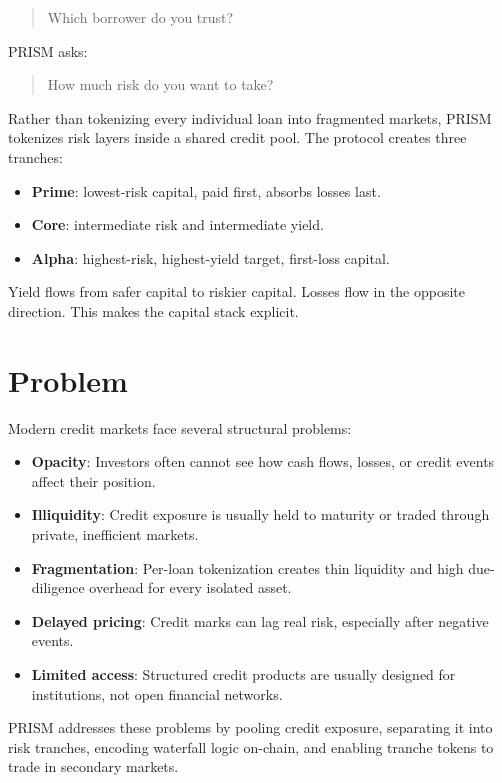 \documentclass[11pt]{article}
\begin{document}
\begin{quote}
Which borrower do you trust?
\end{quote}

PRISM asks:

\begin{quote}
How much risk do you want to take?
\end{quote}

Rather than tokenizing every individual loan into fragmented markets, PRISM
tokenizes risk layers inside a shared credit pool. The protocol creates three
tranches:

\begin{itemize}
  \item \textbf{Prime}: lowest-risk capital, paid first, absorbs losses last.
  \item \textbf{Core}: intermediate risk and intermediate yield.
  \item \textbf{Alpha}: highest-risk, highest-yield target, first-loss capital.
\end{itemize}

Yield flows from safer capital to riskier capital. Losses flow in the opposite
direction. This makes the capital stack explicit.

\section{Problem}

Modern credit markets face several structural problems:

\begin{itemize}
  \item \textbf{Opacity}: Investors often cannot see how cash flows, losses, or
  credit events affect their position.
  \item \textbf{Illiquidity}: Credit exposure is usually held to maturity or
  traded through private, inefficient markets.
  \item \textbf{Fragmentation}: Per-loan tokenization creates thin liquidity and
  high due-diligence overhead for every isolated asset.
  \item \textbf{Delayed pricing}: Credit marks can lag real risk, especially
  after negative events.
  \item \textbf{Limited access}: Structured credit products are usually designed
  for institutions, not open financial networks.
\end{itemize}

PRISM addresses these problems by pooling credit exposure, separating it into
risk tranches, encoding waterfall logic on-chain, and enabling tranche tokens to
trade in secondary markets.
\end{document}
